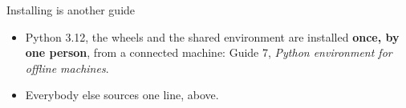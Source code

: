 \begin{frame}{Installing is another guide}
\begin{itemize}
  \item Python 3.12, the wheels and the shared environment are installed
        \textbf{once, by one person}, from a connected machine: Guide 7,
        \emph{Python environment for offline machines}.
  \item Everybody else sources one line, above.
\end{itemize}
\end{frame}
